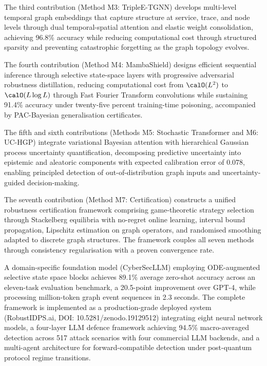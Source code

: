The third contribution (Method M3: TripleE-TGNN) develops multi-level temporal graph embeddings that capture structure at service, trace, and node levels through dual temporal-spatial attention and elastic weight consolidation, achieving 96.8\% accuracy while reducing computational cost through structured sparsity and preventing catastrophic forgetting as the graph topology evolves.

The fourth contribution (Method M4: MambaShield) designs efficient sequential inference through selective state-space layers with progressive adversarial robustness distillation, reducing computational cost from $\calO(L^{2})$ to $\calO(L\log L)$ through Fast Fourier Transform convolutions while sustaining 91.4\% accuracy under twenty-five percent training-time poisoning, accompanied by PAC-Bayesian generalisation certificates.

The fifth and sixth contributions (Methods M5: Stochastic Transformer and M6: UC-HGP) integrate variational Bayesian attention with hierarchical Gaussian process uncertainty quantification, decomposing predictive uncertainty into epistemic and aleatoric components with expected calibration error of 0.078, enabling principled detection of out-of-distribution graph inputs and uncertainty-guided decision-making.

The seventh contribution (Method M7: Certification) constructs a unified robustness certification framework comprising game-theoretic strategy selection through Stackelberg equilibria with no-regret online learning, interval bound propagation, Lipschitz estimation on graph operators, and randomised smoothing adapted to discrete graph structures. The framework couples all seven methods through consistency regularisation with a proven convergence rate.

A domain-specific foundation model (CyberSecLLM) employing ODE-augmented selective state space blocks achieves 89.1\% average zero-shot accuracy across an eleven-task evaluation benchmark, a 20.5-point improvement over GPT-4, while processing million-token graph event sequences in 2.3 seconds. The complete framework is implemented as a production-grade deployed system (RobustIDPS.ai, DOI: 10.5281/zenodo.19129512) integrating eight neural network models, a four-layer LLM defence framework achieving 94.5\% macro-averaged detection across 517 attack scenarios with four commercial LLM backends, and a multi-agent architecture for forward-compatible detection under post-quantum protocol regime transitions.

